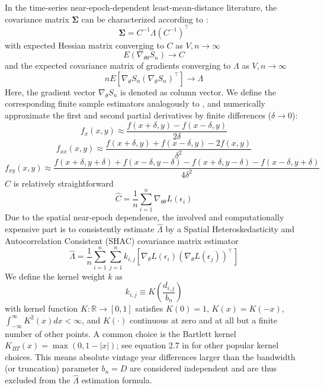 \documentclass[12pt]{article}
\begin{document}
In the time-series near-epoch-dependent least-mean-distance literature, the covariance matrix $\mathbf{\Sigma}$ can be characterized according to \citet[Theorem 11.2.b, Theorem H.1]{PP97}:
\[
\mathbf{\Sigma} = C^{-1} \Lambda (C^{-1})^\top
\]
with expected Hessian matrix converging to $C$ as $V,n \to \infty$
\[
E 
\left(
\nabla_{\theta \theta} S_n
\right)
\to C
\]
and the expected covariance matrix of gradients converging to $\Lambda$ as $V,n \to \infty$
\[
n E 
\left[
\nabla_{\theta} S_n
(\nabla_{\theta} S_n)^\top
\right]
\to \Lambda
\]
Here, the gradient vector $\nabla_{\theta} S_n$ is denoted as column vector.
We define the corresponding finite sample estimators analogously to \citet[Chapters 12, 13.1]{PP97}, and numerically approximate the first and second partial derivatives by finite differences ($\delta \to 0$): 
\[
f_{x}(x,y) \approx \frac{f(x+\delta,y) - f(x-\delta,y)}{2\delta}
\]
\[
f_{xx}(x,y) \approx \frac{f(x+\delta,y) + f(x-\delta,y) - 2  f(x,y)}{\delta^2}
\]
\[
f_{xy}(x,y) \approx \frac{f(x+\delta,y+\delta) + f(x-\delta,y-\delta) -  f(x+\delta,y-\delta) - f(x-\delta,y+\delta)}{4\delta^2}
\]
$\hat{C}$ is relatively straightforward
\[
\hat{C} = \frac{1}{n} \sum_{i=1}^n \nabla_{\theta \theta} L \left( \epsilon_i \right)
\]
Due to the spatial near-epoch dependence, the involved and computationally expensive part is to consistently estimate $\hat{\Lambda}$ by a Spatial Heteroskedasticity and Autocorrelation Consistent (SHAC) covariance matrix estimator \cite[equation 2]{KS11}
\begin{equation}
\label{eq:hac}
\hat{\Lambda} = \frac{1}{n} \sum_{i=1}^n \sum_{j=1}^n
k_{i,j}
\left[
\nabla_{\theta} L \left( \epsilon_i \right)
\left(
\nabla_{\theta} L \left( \epsilon_j \right)
\right)^\top
\right]
\end{equation}
We define the kernel weight $k$ as
\[
k_{i,j} \equiv K \left( \frac{d_{i,j}}{b_n} \right)
\]
with kernel function $K: \mathbb{R} \to [0,1]$ satisfies $K(0)=1$, $K(x)=K(-x)$, $\int_{-\infty}^{\infty} K^2(x) dx < \infty$, and $K(\cdot)$ continuous at zero and at all but a finite number of other points.
A common choice is the Bartlett kernel $K_{BT}(x)= \max(0, 1-|x|)$; see equation 2.7 in \cite{A91} for other popular kernel choices.
This means absolute vintage year differences larger than the bandwidth (or truncation) parameter $b_n=D$ are considered independent and are thus excluded from the $\hat{\Lambda}$ estimation formula.
\end{document}
